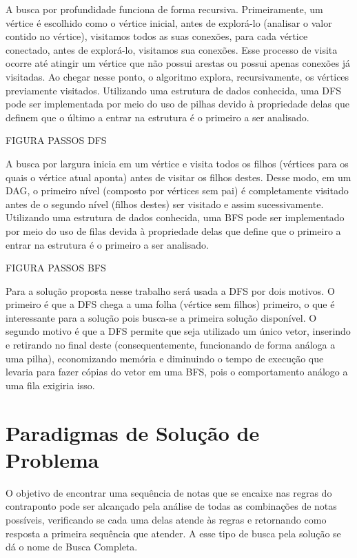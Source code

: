       A busca por profundidade funciona de forma recursiva. Primeiramente, um vértice é escolhido como o vértice inicial, antes de explorá-lo (analisar o valor contido no vértice), visitamos todos as suas conexões, para cada vértice conectado, antes de explorá-lo, visitamos sua conexões. Esse processo de visita ocorre até atingir um vértice que não possui arestas ou possui apenas conexões já visitadas. Ao chegar nesse ponto, o algoritmo explora, recursivamente, os vértices previamente visitados. Utilizando uma estrutura de dados conhecida, uma DFS pode ser implementada por meio do uso de pilhas devido à propriedade delas que definem que o último a entrar na estrutura é o primeiro a ser analisado.

      FIGURA PASSOS DFS

      A busca por largura inicia em um vértice e visita todos os filhos (vértices para os quais o vértice atual aponta) antes de visitar os filhos destes. Desse modo, em um DAG, o primeiro nível (composto por vértices sem pai) é completamente visitado antes de o segundo nível (filhos destes) ser visitado e assim sucessivamente. Utilizando uma estrutura de dados conhecida, uma BFS pode ser implementado por meio do uso de filas devida à propriedade delas que define que o primeiro a entrar na estrutura é o primeiro a ser analisado.

      FIGURA PASSOS BFS

      Para a solução proposta nesse trabalho será usada a DFS por dois motivos. O primeiro é que a DFS chega a uma folha (vértice sem filhos) primeiro, o que é interessante para a solução pois busca-se a primeira solução disponível. O segundo motivo é que a DFS permite que seja utilizado um único vetor, inserindo e retirando no final deste (consequentemente, funcionando de forma análoga a uma pilha), economizando memória e diminuindo o tempo de execução que levaria para fazer cópias do vetor em uma BFS, pois o comportamento análogo a uma fila exigiria isso.


  \section[Paradigmas de Solução de Problema]{Paradigmas de Solução de Problema}

    O objetivo de encontrar uma sequência de notas que se encaixe nas regras do contraponto pode ser alcançado pela análise de todas as combinações de notas possíveis, verificando se cada uma delas atende às regras e retornando como resposta a primeira sequência que atender. A esse tipo de busca pela solução se dá o nome de Busca Completa.

